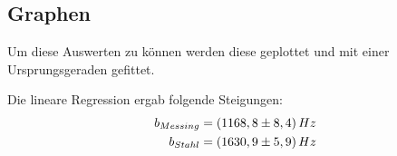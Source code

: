 \subsection{Graphen}
Um diese Auswerten zu können werden diese geplottet und mit einer Ursprungsgeraden gefittet.
\begin{center}
\noindent
\begin{minipage}{\linewidth}
\centering
{}
\end{minipage}
\end{center}
\begin{center}
\noindent
\begin{minipage}{\linewidth}
\centering
{}
\end{minipage}
\end{center}
Die lineare Regression ergab folgende Steigungen:
\begin{align}
b_{Messing} = (1168,8 \pm 8,4)\, Hz \notag \\
b_{Stahl} = (1630,9 \pm 5,9)\, Hz \notag
\end{align}
